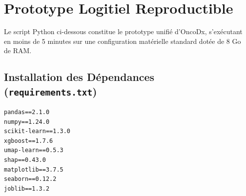 \documentclass[12pt,a4paper]{report}
\let\oldchapter\chapter
\renewcommand{\chapter}{\clearpage\oldchapter}
\begin{document}
\chapter{Prototype Logitiel Reproductible}
Le script Python ci-dessous constitue le prototype unifi\'e d'OncoDx, s'ex\'ecutant en moins de 5 minutes sur une configuration mat\'erielle standard dot\'ee de 8 Go de RAM.

\section{Installation des D\'ependances (\texttt{requirements.txt})}
\begin{lstlisting}[style=code]
pandas==2.1.0
numpy==1.24.0
scikit-learn==1.3.0
xgboost==1.7.6
umap-learn==0.5.3
shap==0.43.0
matplotlib==3.7.5
seaborn==0.12.2
joblib==1.3.2
\end{lstlisting}
\end{document}
